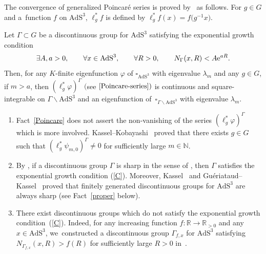 The convergence of generalized Poincar\'e series is proved by~\cite{KaKob16} as follows.
For $g \in G$ and a~function $f$ on $\mathrm{AdS}^{3}$,
$\ell_{g}^{*}f$ is defined by $\ell_{g}^{*}f(x)=f\big(g^{-1}x\big)$.
\begin{Fact}\label{Poincare}
Let $\Gamma \subset G$ be a discontinuous group for $\mathrm{AdS}^{3}$
satisfying the exponential growth condition
\begin{gather}\label{C}
\exists A,a > 0,\qquad
\forall x\in \mathrm{AdS}^{3},\qquad
\forall R>0, \qquad
N_{\Gamma}(x,R) < A{\rm e}^{aR}.
\end{gather}
Then, for any $K$-finite eigenfunction $\varphi$ of $\square_{\mathrm{AdS}^{3}}$ with eigenvalue
$\lambda_{m}$
and any $g\in G$,
if $m > a$, then
$(\ell_{g}^{*}\varphi)^{\Gamma}$ $($see $\eqref{Poincare-series})$ is continuous and square-integrable on
$\Gamma\backslash\mathrm{AdS}^{3}$ and
an eigenfunction of~$\square_{\Gamma\backslash\mathrm{AdS}^{3}}$ with eigenvalue
$\lambda_{m}$.
\end{Fact}

\begin{Remark}\label{remPoincare}\quad
\begin{enumerate}\itemsep=0pt
\item[(1)]
Fact~\ref{Poincare} does not assert the non-vanishing of the series
$(\ell_{g}^{*}\varphi)^{\Gamma}$ which is more involved.
Kassel--Kobayashi~\cite{KaKob16} proved that
there exists $g\in G$ such that
$(\ell^{*}_{g}\psi_{m,0})^{\Gamma}\neq 0$
for sufficiently large $m \in \mathbb{N}$.
\item[(2)]
By \cite[Lemma~4.6.4]{KaKob16}, if a discontinuous group $\Gamma$ is sharp
in the sense of \cite[Definition~4.2]{KaKob16},
then $\Gamma$ satisfies the exponential growth condition (\ref{C}).
Moreover, Kassel~\cite{Ka09} and Gu\'eriataud--Kassel~\cite{GuKa17}
proved that finitely generated discontinuous groups for $\mathrm{AdS}^{3}$
are always sharp (see Fact~\ref{proper} below).
\item[(3)]
There exist discontinuous groups
which do not satisfy the exponential growth condition~(\ref{C}).
Indeed, for any increasing function $f\colon\mathbb{R}\rightarrow \mathbb{R}_{>0}$
and any $x\in\mathrm{AdS}^{3}$,
we~con\-st\-ructed
a discontinuous group $\Gamma_{f,x}$ for $\mathrm{AdS}^{3}$
satisfying $N_{\Gamma_{f,x}}(x,R) > f(R)$ for sufficiently large $R>0$ in~\cite{Kan19}.
\end{enumerate}
\end{Remark}

